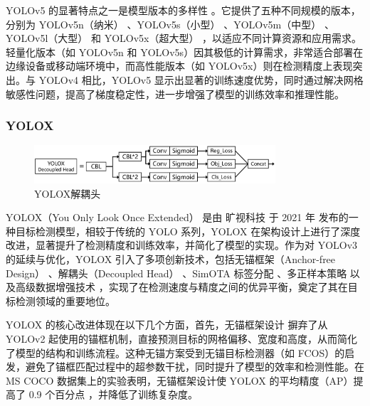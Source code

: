 \documentclass[11pt,twocolumn]{ctexart}
\begin{document}
YOLOv5 的显著特点之一是模型版本的多样性 。它提供了五种不同规模的版本，分别为 YOLOv5n（纳米） 、YOLOv5s（小型） 、YOLOv5m（中型） 、YOLOv5l（大型） 和 YOLOv5x（超大型） ，以适应不同计算资源和应用需求。轻量化版本（如 YOLOv5n 和 YOLOv5s）因其极低的计算需求，非常适合部署在边缘设备或移动端环境中，而高性能版本（如 YOLOv5x）则在检测精度上表现突出。与 YOLOv4 相比，YOLOv5 显示出显著的训练速度优势，同时通过解决网格敏感性问题，提高了梯度稳定性，进一步增强了模型的训练效率和推理性能。

\subsubsection{YOLOX}

\begin{figure}[!hbtp]
  \begin{center}
  \includegraphics[width=0.8\textwidth]{figure/YOLOX解耦头}
    \end{center}
  \caption{YOLOX解耦头}
  \label{YOLOX解耦头}
\end{figure}

YOLOX（You Only Look Once Extended）\cite{ge2021yolox} 是由 旷视科技 于 2021 年 发布的一种目标检测模型，相较于传统的 YOLO 系列，YOLOX 在架构设计上进行了深度改进，显著提升了检测精度和训练效率，并简化了模型的实现。作为对 YOLOv3 的延续与优化，YOLOX 引入了多项创新技术，包括无锚框架（Anchor-free Design） 、解耦头（Decoupled Head） 、SimOTA 标签分配 、多正样本策略 以及高级数据增强技术 ，实现了在检测速度与精度之间的优异平衡，奠定了其在目标检测领域的重要地位。

YOLOX 的核心改进体现在以下几个方面，首先，无锚框架设计 摒弃了从 YOLOv2 起使用的锚框机制，直接预测目标的网格偏移、宽度和高度，从而简化了模型的结构和训练流程。这种无锚方案受到无锚目标检测器（如 FCOS）的启发，避免了锚框匹配过程中的超参数干扰，同时提升了模型的效率和检测性能。在 MS COCO 数据集上的实验表明，无锚框架设计使 YOLOX 的平均精度（AP）提高了 0.9 个百分点 ，并降低了训练复杂度。
\end{document}
